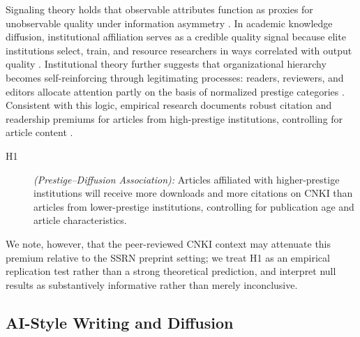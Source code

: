 \documentclass[12pt,a4paper]{article}
\begin{document}
Signaling theory holds that observable attributes function as proxies
for unobservable quality under information asymmetry \citep{Spence1973}.
In academic knowledge diffusion, institutional affiliation serves as a
credible quality signal because elite institutions select, train, and
resource researchers in ways correlated with output quality
\citep{Long1979,Lariviere2010}.
Institutional theory further suggests that organizational hierarchy
becomes self-reinforcing through legitimating processes: readers,
reviewers, and editors allocate attention partly on the basis of
normalized prestige categories \citep{DiMaggio1983}.
Consistent with this logic, empirical research documents robust
citation and readership premiums for articles from high-prestige
institutions, controlling for article content \citep{Wang2013}.
\begin{description}
  \item[H1] \textit{(Prestige--Diffusion Association):}
  Articles affiliated with higher-prestige institutions will receive
  more downloads and more citations on CNKI than articles from
  lower-prestige institutions, controlling for publication age
  and article characteristics.
\end{description}
We note, however, that the peer-reviewed CNKI context may attenuate
this premium relative to the SSRN preprint setting; we treat H1 as an
empirical replication test rather than a strong theoretical prediction,
and interpret null results as substantively informative rather than
merely inconclusive.

\subsection{AI-Style Writing and Diffusion}
\end{document}
